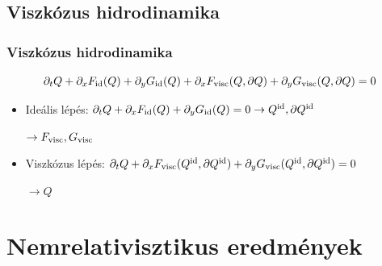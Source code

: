 \documentclass{beamer}
\begin{document}
\subsection{Viszkózus hidrodinamika}
\begin{frame}[noframenumbering]
\frametitle{Viszkózus hidrodinamika}
\begin{equation*}
\partial_t Q + \partial_x F_{\rm id}(Q)+\partial_y G_{\rm id}(Q)+\partial_x F_{\rm visc}(Q,\partial Q)+\partial_y G_{\rm visc}(Q,\partial Q) = 0
\end{equation*}
\vspace{10pt}
\begin{itemize}
\setlength{\itemsep}{20pt}
\item<1-> Ideális lépés: $\partial_t Q + \partial_x F_{\rm id}(Q)+\partial_y G_{\rm id}(Q)=0\rightarrow Q^{\rm id},\partial Q^{\rm id}$

$\rightarrow F_{\rm visc}, G_{\rm visc}$ 

\item<1-> Viszkózus lépés: $\partial_t Q + \partial_x F_{\rm visc}(Q^{\rm id},\partial Q^{\rm id})+\partial_y G_{\rm visc}(Q^{\rm id},\partial Q^{\rm id}) = 0$ 

$\rightarrow Q$ 

\end{itemize}



\end{frame}

\section{Nemrelativisztikus eredmények}
\end{document}
